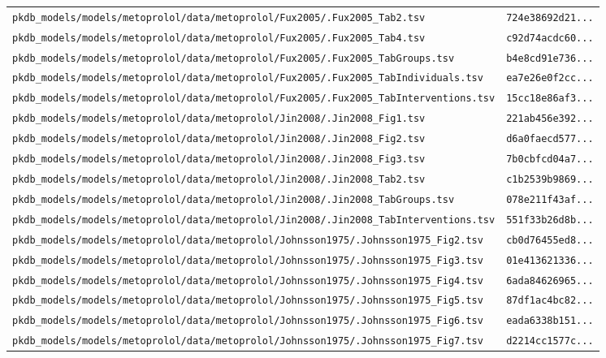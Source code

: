 \documentclass{article}
\begin{document}
\begin{longtable}{ll}
\texttt{pkdb\_models/models/metoprolol/data/metoprolol/Fux2005/.Fux2005\_Tab2.tsv} & \texttt{724e38692d21...} \\
\texttt{pkdb\_models/models/metoprolol/data/metoprolol/Fux2005/.Fux2005\_Tab4.tsv} & \texttt{c92d74acdc60...} \\
\texttt{pkdb\_models/models/metoprolol/data/metoprolol/Fux2005/.Fux2005\_TabGroups.tsv} & \texttt{b4e8cd91e736...} \\
\texttt{pkdb\_models/models/metoprolol/data/metoprolol/Fux2005/.Fux2005\_TabIndividuals.tsv} & \texttt{ea7e26e0f2cc...} \\
\texttt{pkdb\_models/models/metoprolol/data/metoprolol/Fux2005/.Fux2005\_TabInterventions.tsv} & \texttt{15cc18e86af3...} \\
\texttt{pkdb\_models/models/metoprolol/data/metoprolol/Jin2008/.Jin2008\_Fig1.tsv} & \texttt{221ab456e392...} \\
\texttt{pkdb\_models/models/metoprolol/data/metoprolol/Jin2008/.Jin2008\_Fig2.tsv} & \texttt{d6a0faecd577...} \\
\texttt{pkdb\_models/models/metoprolol/data/metoprolol/Jin2008/.Jin2008\_Fig3.tsv} & \texttt{7b0cbfcd04a7...} \\
\texttt{pkdb\_models/models/metoprolol/data/metoprolol/Jin2008/.Jin2008\_Tab2.tsv} & \texttt{c1b2539b9869...} \\
\texttt{pkdb\_models/models/metoprolol/data/metoprolol/Jin2008/.Jin2008\_TabGroups.tsv} & \texttt{078e211f43af...} \\
\texttt{pkdb\_models/models/metoprolol/data/metoprolol/Jin2008/.Jin2008\_TabInterventions.tsv} & \texttt{551f33b26d8b...} \\
\texttt{pkdb\_models/models/metoprolol/data/metoprolol/Johnsson1975/.Johnsson1975\_Fig2.tsv} & \texttt{cb0d76455ed8...} \\
\texttt{pkdb\_models/models/metoprolol/data/metoprolol/Johnsson1975/.Johnsson1975\_Fig3.tsv} & \texttt{01e413621336...} \\
\texttt{pkdb\_models/models/metoprolol/data/metoprolol/Johnsson1975/.Johnsson1975\_Fig4.tsv} & \texttt{6ada84626965...} \\
\texttt{pkdb\_models/models/metoprolol/data/metoprolol/Johnsson1975/.Johnsson1975\_Fig5.tsv} & \texttt{87df1ac4bc82...} \\
\texttt{pkdb\_models/models/metoprolol/data/metoprolol/Johnsson1975/.Johnsson1975\_Fig6.tsv} & \texttt{eada6338b151...} \\
\texttt{pkdb\_models/models/metoprolol/data/metoprolol/Johnsson1975/.Johnsson1975\_Fig7.tsv} & \texttt{d2214cc1577c...} \\

\end{longtable}
\end{document}
